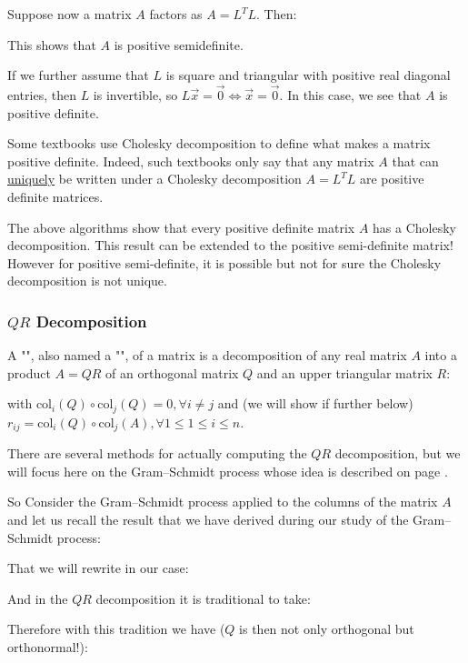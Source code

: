 	Suppose now a matrix $A$ factors as $A=L^TL$. Then:
	
	This shows that $A$ is positive semidefinite.
	
	If we further assume that $L$ is square and triangular with positive real diagonal entries, then $L$ is invertible, so $L\vec{x}=\vec{0}\Leftrightarrow \vec{x}=\vec{0}$. In this case, we see that $A$ is positive definite.
	
	Some textbooks use Cholesky decomposition to define what makes a matrix positive definite. Indeed, such textbooks only say that any matrix $A$ that can \underline{uniquely} be written under a Cholesky decomposition $A=L^TL$ are positive definite matrices.
	
	\begin{tcolorbox}[title=Remark,colframe=black,arc=10pt]
	The above algorithms show that every positive definite matrix $A$ has a Cholesky decomposition. This result can be extended to the positive semi-definite matrix! However for positive semi-definite, it is possible but not for sure the Cholesky decomposition is not unique.
	\end{tcolorbox}
	
	
	\subsubsection{$QR$ Decomposition}\label{QR decomposition}
	A "", also named a "", of a matrix is a decomposition of any real matrix $A$ into a product $A = QR$ of an orthogonal matrix $Q$ and an upper triangular matrix $R$:
	
	with $\text{col}_i(Q)\circ \text{col}_j(Q)=0, \forall i\neq j$ and (we will show if further below) $r_{ij}=\text{col}_i(Q)\circ \text{col}_j(A), \forall 1\leq 1\leq i\leq n$.
	
	There are several methods for actually computing the $QR$ decomposition, but we will focus here on the Gram–Schmidt process whose idea is described on page \pageref{gram-schmidt procedure}.
	
	So Consider the Gram–Schmidt process applied to the columns of the matrix $A$ and let us recall the result that we have derived during our study of the Gram–Schmidt process:
	
	That we will rewrite in our case:
	
	And in the $QR$ decomposition it is traditional to take:
	
	Therefore with this tradition we have ($Q$ is then not only orthogonal but orthonormal!):
	
